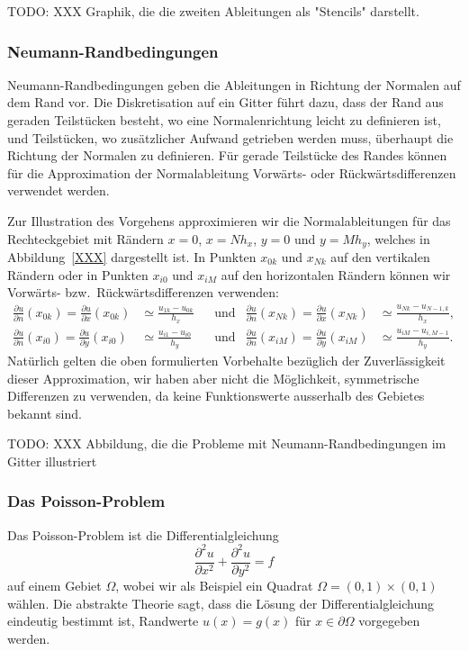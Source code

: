 TODO: XXX Graphik, die die zweiten Ableitungen als "Stencils" darstellt.

\subsubsection{Neumann-Randbedingungen}
Neumann-Randbedingungen geben die Ableitungen in Richtung der Normalen
auf dem Rand vor.
Die Diskretisation auf ein Gitter führt dazu, dass der Rand aus geraden
Teilstücken besteht, wo eine Normalenrichtung leicht zu definieren ist,
und Teilstücken, wo zusätzlicher Aufwand getrieben werden muss, überhaupt
die Richtung der Normalen zu definieren.
Für gerade Teilstücke des Randes können für die Approximation der
Normalableitung Vorwärts- oder Rückwärtsdifferenzen verwendet
werden.

\begin{beispiel}
Zur Illustration des Vorgehens approximieren wir die Normalableitungen
für das Rechteckgebiet mit Rändern $x=0$, $x=Nh_x$, $y=0$ und $y=Mh_y$,
welches in Abbildung~\ref{XXX} dargestellt ist.
In Punkten $x_{0k}$ und $x_{Nk}$ auf den vertikalen Rändern
oder in Punkten $x_{i0}$ und $x_{iM}$ auf den horizontalen Rändern
können wir Vorwärts- bzw.~Rückwärtsdifferenzen verwenden:
\begin{align*}
\frac{\partial u}{\partial n}(x_{0k})
=
\frac{\partial u}{\partial x}(x_{0k})
&\simeq
\frac{u_{1k}-u_{0k}}{h_x}
&&\text{und}&
\frac{\partial u}{\partial n}(x_{Nk})
=
\frac{\partial u}{\partial x}(x_{Nk})
&\simeq
\frac{u_{Nk}-u_{N-1,k}}{h_x},
\\
\frac{\partial u}{\partial n}(x_{i0})
=
\frac{\partial u}{\partial y}(x_{i0})
&\simeq
\frac{u_{i1}-u_{i0}}{h_y}
&&\text{und}&
\frac{\partial u}{\partial n}(x_{iM})
=
\frac{\partial u}{\partial y}(x_{iM})
&\simeq
\frac{u_{iM}-u_{i,M-1}}{h_y}.
\end{align*}
Natürlich gelten die oben formulierten Vorbehalte bezüglich der
Zuverlässigkeit dieser Approximation, wir haben aber nicht die Möglichkeit,
symmetrische Differenzen zu verwenden, da keine Funktionswerte ausserhalb
des Gebietes bekannt sind.
\end{beispiel}

TODO: XXX Abbildung, die die Probleme mit Neumann-Randbedingungen im
Gitter illustriert

\subsubsection{Das Poisson-Problem}
Das Poisson-Problem ist die Differentialgleichung
\[
\frac{\partial^2 u}{\partial x^2}
+
\frac{\partial^2 u}{\partial y^2}
=
f
\]
auf einem Gebiet $\Omega$, wobei wir als Beispiel ein Quadrat
$\Omega = (0,1) \times (0,1)$ wählen.
Die abstrakte Theorie sagt, dass die Lösung der Differentialgleichung
eindeutig bestimmt ist, Randwerte $u(x)=g(x)$ für $x\in\partial\Omega$
vorgegeben werden.

